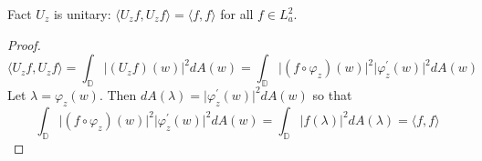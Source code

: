 \documentclass{beamer}
\begin{document}
\begin{frame}
\begin{block}{Fact}
$U_z$ is unitary: $\langle U_z f, U_z f \rangle = \langle f, f \rangle$ for all $f \in L_a^2$.
\end{block}
\begin{proof}
\[
\langle U_z f, U_z f \rangle = \int_\mathbb{D} \vert (U_zf)(w) \vert^2 dA(w) = \int_\mathbb{D} \vert (f \circ \varphi_z)(w) \vert^2 \vert \varphi_z^\prime(w)\vert^2 dA(w)
\] Let $\lambda = \varphi_z(w)$. Then $dA(\lambda) = \vert \varphi_z^\prime(w) \vert^2 dA(w)$ so that
\[
\int_\mathbb{D} \vert (f \circ \varphi_z)(w) \vert^2 \vert \varphi_z^\prime(w)\vert^2 dA(w) = \int_\mathbb{D} \vert f(\lambda) \vert^2 dA(\lambda) = \langle f, f \rangle
\]
\end{proof}
\end{frame}
\end{document}
